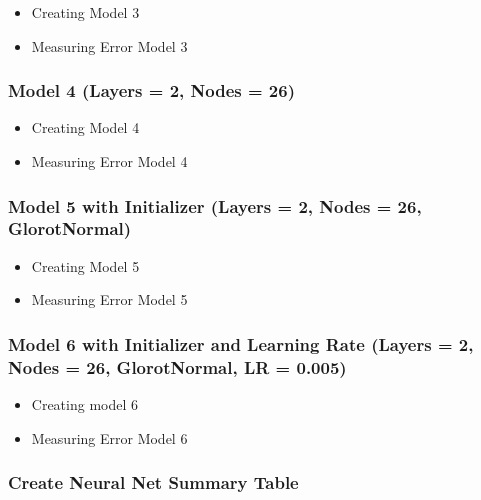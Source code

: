 \documentclass[
  paper=a4,
  ,captions=tableheading
]{scrartcl}
\begin{document}
\begin{itemize}
\item
  Creating Model 3
\item
  Measuring Error Model 3
\end{itemize}

\hypertarget{model-4-layers-2-nodes-26}{%
\subsubsection{Model 4 (Layers = 2, Nodes =
26)}\label{model-4-layers-2-nodes-26}}

\begin{itemize}
\item
  Creating Model 4
\item
  Measuring Error Model 4
\end{itemize}

\hypertarget{model-5-with-initializer-layers-2-nodes-26-glorotnormal}{%
\subsubsection{Model 5 with Initializer (Layers = 2, Nodes = 26,
GlorotNormal)}\label{model-5-with-initializer-layers-2-nodes-26-glorotnormal}}

\begin{itemize}
\item
  Creating Model 5
\item
  Measuring Error Model 5
\end{itemize}

\hypertarget{model-6-with-initializer-and-learning-rate-layers-2-nodes-26-glorotnormal-lr-0.005}{%
\subsubsection{Model 6 with Initializer and Learning Rate (Layers = 2,
Nodes = 26, GlorotNormal, LR =
0.005)}\label{model-6-with-initializer-and-learning-rate-layers-2-nodes-26-glorotnormal-lr-0.005}}

\begin{itemize}
\item
  Creating model 6
\item
  Measuring Error Model 6
\end{itemize}

\hypertarget{create-neural-net-summary-table}{%
\subsubsection{Create Neural Net Summary
Table}\label{create-neural-net-summary-table}}
\end{document}
